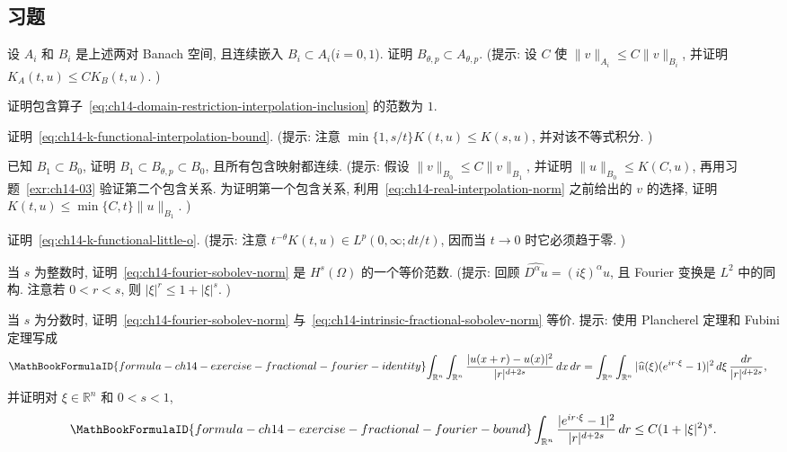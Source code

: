 \subsection{习题}
\label{sec:ch14-exercises}
\setcounter{exerciseitem}{0}

\begin{MBExercise}
\label{exr:ch14-01}
设 $A_i$ 和 $B_i$ 是上述两对 Banach 空间, 且连续嵌入 $B_i\subset A_i$($i=0,1$). 证明 $B_{\theta,p}\subset A_{\theta,p}$. (提示: 设 $C$ 使 $\|v\|_{A_i}\leq C\|v\|_{B_i}$, 并证明 $K_A(t,u)\leq CK_B(t,u)$. )
\end{MBExercise}

\begin{MBExercise}
\label{exr:ch14-02}
证明包含算子~\eqref{eq:ch14-domain-restriction-interpolation-inclusion} 的范数为 $1$.
\end{MBExercise}

\begin{MBExercise}
\label{exr:ch14-03}
证明~\eqref{eq:ch14-k-functional-interpolation-bound}. (提示: 注意 $\min\{1,s/t\}K(t,u)\leq K(s,u)$, 并对该不等式积分. )
\end{MBExercise}

\begin{MBExercise}
\label{exr:ch14-04}
已知 $B_1\subset B_0$, 证明 $B_1\subset B_{\theta,p}\subset B_0$, 且所有包含映射都连续. (提示: 假设 $\|v\|_{B_0}\leq C\|v\|_{B_1}$, 并证明 $\|u\|_{B_0}\leq K(C,u)$, 再用习题~\ref{exr:ch14-03} 验证第二个包含关系. 为证明第一个包含关系, 利用~\eqref{eq:ch14-real-interpolation-norm} 之前给出的 $v$ 的选择, 证明 $K(t,u)\leq\min\{C,t\}\|u\|_{B_1}$. )
\end{MBExercise}

\begin{MBExercise}
\label{exr:ch14-05}
证明~\eqref{eq:ch14-k-functional-little-o}. (提示: 注意 $t^{-\theta}K(t,u)\in L^p(0,\infty;dt/t)$, 因而当 $t\to0$ 时它必须趋于零. )
\end{MBExercise}

\begin{MBExercise}
\label{exr:ch14-06}
当 $s$ 为整数时, 证明~\eqref{eq:ch14-fourier-sobolev-norm} 是 $H^s(\Omega)$ 的一个等价范数. (提示: 回顾 $\widehat{D^\alpha u}=(i\xi)^\alpha\widehat u$, 且 Fourier 变换是 $L^2$ 中的同构. 注意若 $0<r<s$, 则 $|\xi|^r\leq1+|\xi|^s$. )
\end{MBExercise}

\begin{MBExercise}
\label{exr:ch14-07}
当 $s$ 为分数时, 证明~\eqref{eq:ch14-fourier-sobolev-norm} 与~\eqref{eq:ch14-intrinsic-fractional-sobolev-norm} 等价. 提示: 使用 Plancherel 定理和 Fubini 定理写成
\[
\MathBookFormulaID{formula-ch14-exercise-fractional-fourier-identity}
\begin{aligned}
\int_{\mathbb R^n}\int_{\mathbb R^n}
\frac{|u(x+r)-u(x)|^2}{|r|^{d+2s}}\,dx\,dr
&=\int_{\mathbb R^n}\int_{\mathbb R^n}
|\widehat u(\xi)(e^{ir\cdot\xi}-1)|^2\,d\xi\,
\frac{dr}{|r|^{d+2s}},
\end{aligned}
\]
并证明对 $\xi\in\mathbb R^n$ 和 $0<s<1$,
\[
\MathBookFormulaID{formula-ch14-exercise-fractional-fourier-bound}
\int_{\mathbb R^n}\frac{|e^{ir\cdot\xi}-1|^2}{|r|^{d+2s}}\,dr
\leq C(1+|\xi|^2)^s.
\]
\end{MBExercise}

